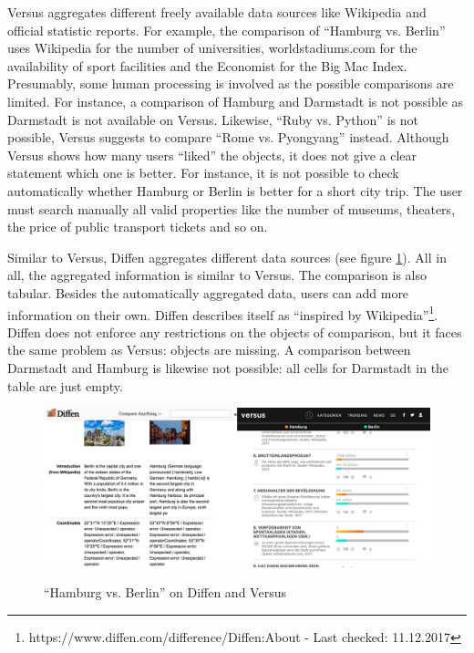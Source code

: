 Versus aggregates different freely available data sources like Wikipedia and official statistic reports. For example, the comparison of \enquote{Hamburg vs. Berlin} uses Wikipedia for the number of universities, worldstadiums.com for the availability of sport facilities and the Economist for the Big Mac Index. Presumably, some human processing is involved as the possible comparisons are limited. For instance, a comparison of Hamburg and Darmstadt is not possible as Darmstadt is not available on Versus. Likewise, \enquote{Ruby vs. Python} is not possible, Versus suggests to compare \enquote{Rome vs. Pyongyang} instead. Although Versus shows how many users \enquote{liked} the objects, it does not give a clear statement which one is better. For instance, it is not possible to check automatically whether Hamburg or Berlin is better for a short city trip. The user must search manually all valid properties like the number of museums, theaters, the price of public transport tickets and so on.

Similar to Versus, Diffen aggregates different data sources (see figure \ref{img:diffversus}). All in all, the aggregated information is similar to Versus. The comparison is also tabular. Besides the automatically aggregated data, users can add more information on their own. Diffen describes itself as \enquote{inspired by Wikipedia}\footnote{https://www.diffen.com/difference/Diffen:About - Last checked: 11.12.2017}. Diffen does not enforce any restrictions on the objects of comparison, but it faces the same problem as Versus: objects are missing. A comparison between Darmstadt and Hamburg is likewise not possible: all cells for Darmstadt in the table are just empty.\newline

\begin{figure}[h]
\includegraphics[width=1\textwidth]{images/ds-sys/diffversus}
\label{img:diffversus}
\caption{\enquote{Hamburg vs. Berlin} on Diffen and Versus}
\end{figure}

